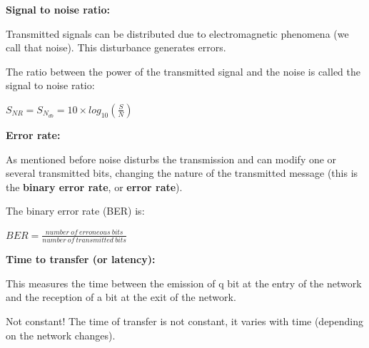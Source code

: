 \documentclass{beamer}[10pt, usepdftitle=false, handout]
\begin{document}
	\begin{frame}
	
	\textbf{Signal to noise ratio:}
	\vspace*{1em}

	Transmitted signals can be distributed due to electromagnetic phenomena (we call that noise). This disturbance generates errors.
	\vspace*{0.5em}
	
	The ratio between the power of the transmitted signal and the noise is called the signal to noise ratio:
	\vspace*{0.5em}	
	
	$S_{NR} = S_{N_{db}} = 10 \times log_{10}(\frac{S}{N})$
	
	
	
	\end{frame}
	
	\begin{frame}
	
	\textbf{Error rate:} 
	\vspace*{1em}
	
	As mentioned before noise disturbs the transmission and can modify one or several transmitted bits, changing the nature of the transmitted message (this is the \textbf{binary error rate}, or \textbf{error rate}).
	\vspace*{0.5em}
		
	The binary error rate (BER) is: 
	\vspace*{0.5em}
	
	$BER = \frac{number\ of\ erroneous\ bits}{number\ of\ transmitted\ bits}$
		
	
	\end{frame}	
	
	\begin{frame}
	
	\textbf{Time to transfer (or latency):}
	\vspace*{1em}
	
	This measures the time between the emission of q bit at the entry of the network and the reception of a bit at the exit of the network.
	\vspace*{0.5em}
	
	\begin{alertblock}{Not constant!}
	The time of transfer is not constant, it varies with time (depending on the network changes).
	\end{alertblock}
		
	
		
		
	
	\end{frame}	
	
\end{document}

